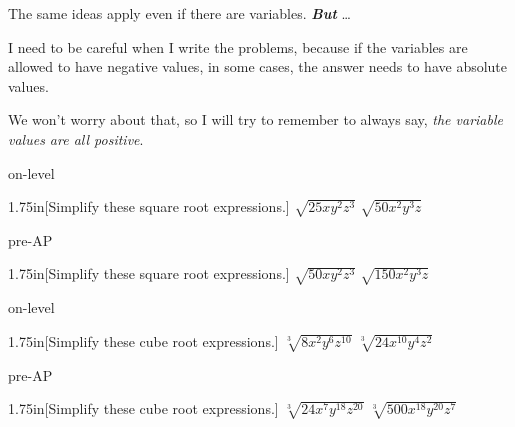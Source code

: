 
    The same ideas apply even if there are variables. {\bfseries\itshape But }\dots

    I need to be careful when I write the problems,
    because if the variables are allowed to have negative values,
    in some cases, the answer needs to have absolute values.

    We won't worry about that, so I will try to remember to always say,
    \textit{the variable values are all positive}.

\begin{taggedblock}{on-level}
    \begin{my2Problems}{1.75in}[Simplify these square root expressions.]
        {
            $\sqrt{25xy^2z^3}$ 
        }
        {
            $\sqrt{50x^2y^3z}$ 
        }
    \end{my2Problems}
\end{taggedblock}
\begin{taggedblock}{pre-AP}
    \begin{my2Problems}{1.75in}[Simplify these square root expressions.]
        {
            $\sqrt{50xy^2z^3}$ 
        }
        {
            $\sqrt{150x^2y^3z}$ 
        }
    \end{my2Problems}
\end{taggedblock}


\begin{taggedblock}{on-level}
    \begin{my2Problems}{1.75in}[Simplify these cube root expressions.]
        {
            $\sqrt[3]{8x^2y^6z^{10}}$ 
        }
        {
            $\sqrt[3]{24x^{10}y^4z^2}$ 
        }
    \end{my2Problems}
\end{taggedblock}
\begin{taggedblock}{pre-AP}
    \begin{my2Problems}{1.75in}[Simplify these cube root expressions.]
        {
            $\sqrt[3]{24x^7y^{18}z^{20}}$ 
        }
        {
            $\sqrt[3]{500x^{18}y^{20}z^7}$ 
        }
    \end{my2Problems}
\end{taggedblock}

